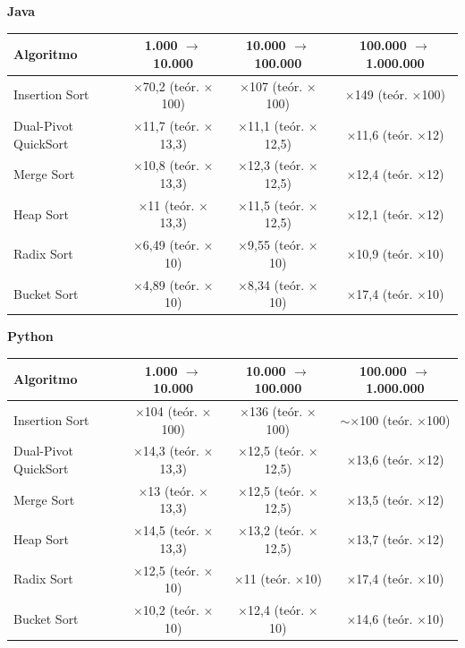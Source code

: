 \textbf{Java}\par\smallskip
{\footnotesize
\begin{tabular}{lccc}
\toprule
Algoritmo & 1.000 $\to$ 10.000 & 10.000 $\to$ 100.000 & 100.000 $\to$ 1.000.000 \\
\midrule
Insertion Sort & $\times$70,2 (te\'or. $\times$100) & $\times$107 (te\'or. $\times$100) & $\times$149 (te\'or. $\times$100) \\
Dual-Pivot QuickSort & $\times$11,7 (te\'or. $\times$13,3) & $\times$11,1 (te\'or. $\times$12,5) & $\times$11,6 (te\'or. $\times$12) \\
Merge Sort & $\times$10,8 (te\'or. $\times$13,3) & $\times$12,3 (te\'or. $\times$12,5) & $\times$12,4 (te\'or. $\times$12) \\
Heap Sort & $\times$11 (te\'or. $\times$13,3) & $\times$11,5 (te\'or. $\times$12,5) & $\times$12,1 (te\'or. $\times$12) \\
Radix Sort & $\times$6,49 (te\'or. $\times$10) & $\times$9,55 (te\'or. $\times$10) & $\times$10,9 (te\'or. $\times$10) \\
Bucket Sort & $\times$4,89 (te\'or. $\times$10) & $\times$8,34 (te\'or. $\times$10) & $\times$17,4 (te\'or. $\times$10) \\
\bottomrule
\end{tabular}}\par
\medskip
\textbf{Python}\par\smallskip
{\footnotesize
\begin{tabular}{lccc}
\toprule
Algoritmo & 1.000 $\to$ 10.000 & 10.000 $\to$ 100.000 & 100.000 $\to$ 1.000.000 \\
\midrule
Insertion Sort & $\times$104 (te\'or. $\times$100) & $\times$136 (te\'or. $\times$100) & $\sim$$\times$100 (te\'or. $\times$100) \\
Dual-Pivot QuickSort & $\times$14,3 (te\'or. $\times$13,3) & $\times$12,5 (te\'or. $\times$12,5) & $\times$13,6 (te\'or. $\times$12) \\
Merge Sort & $\times$13 (te\'or. $\times$13,3) & $\times$12,5 (te\'or. $\times$12,5) & $\times$13,5 (te\'or. $\times$12) \\
Heap Sort & $\times$14,5 (te\'or. $\times$13,3) & $\times$13,2 (te\'or. $\times$12,5) & $\times$13,7 (te\'or. $\times$12) \\
Radix Sort & $\times$12,5 (te\'or. $\times$10) & $\times$11 (te\'or. $\times$10) & $\times$17,4 (te\'or. $\times$10) \\
Bucket Sort & $\times$10,2 (te\'or. $\times$10) & $\times$12,4 (te\'or. $\times$10) & $\times$14,6 (te\'or. $\times$10) \\
\bottomrule
\end{tabular}}\par
\medskip
